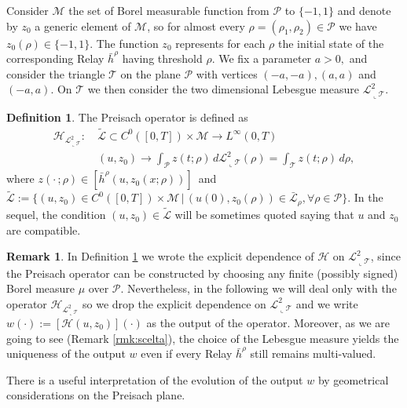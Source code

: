 \documentclass[12pt]{article}
\newcommand{\M}{\mathcal{M}}
\newcommand{\HM}{\mathcal{H}}
\newcommand{\LL}{\mathcal{L}}
\newcommand{\LM}{\mathscr{L}}
\newcommand{\T}{\mathcal{T}}
\newcommand{\PP}{\mathcal{P}}
\newcommand{\p}{\rho}
\newcommand{\1}{\mathds{1}}
\theoremstyle{definition}
\newtheorem{defi}[teo]{Definition}
\newtheorem{rmk}[teo]{Remark}
\begin{document}
Consider $\M$ the set of Borel measurable function from $\PP$ to $\{-1,1\}$ and denote by $z_0$ a generic element of $\M$, so for almost every $ \p=(\p_1,\p_2)\in \PP$ we have $z_0(\p) \in \{-1,1\}.$ The function $z_0$ represents for each $\p$ the initial state of the corresponding Relay $\bar{h}^\rho$ having threshold $\p$. We fix a parameter $a>0,$ and consider the triangle $\T$ on the plane $\PP$ with vertices $(-a,-a),(a,a)$ and $(-a,a)$. On $\T$ we then consider the two dimensional Lebesgue measure $\LM^2_{\llcorner \T}$.
\begin{defi}\label{def: POpe}
    The Preisach operator is defined as 
    \begin{equation}
    \label{eq:Preisach}
        \begin{split}
            \HM_{\LM^2_{\llcorner \T}} :~& \tilde{\LL} \subset C^0([0,T]) \times \M \to L^{\infty}(0,T) \\
            &(u,z_0)\to \int_{\PP} 
            z(t;\p)
            \,d \LM^2_{\llcorner \T} (\p)= \int_\T z(t;\p)\, d\p,
            \end{split}
        \end{equation}
        where $z(\cdot\,;\p)\in[\bar{h}^\p (u, z_0(x;\p))]\,$ and $\tilde{\LL}:=\{(u,z_0)\in C^0([0,T])\times \M \,|\, (u(0),z_0(\p)) \in \bar{\LL}_\p,\forall \p \in \PP\}.$ In the sequel, the condition $(u,z_0)\in\tilde{\LL}$ will be sometimes quoted saying that $u$ and $z_0$ are compatible.
\end{defi}

\begin{rmk}
    In Definition \ref{def: POpe} we wrote the explicit dependence of $\HM$ on $\LM^2_{\llcorner \T}$, since the Preisach operator can be constructed by choosing any finite (possibly signed) Borel measure $\mu$ over $\PP$. Nevertheless, in the following we will deal only with the operator $\HM_{\LM^2_{\llcorner \T}}$ so we drop the explicit dependence on $\LM^2_{\llcorner \T}$ and we write $w(\cdot):=[\HM(u,z_0)](\cdot)$ as the output of the operator. Moreover, as we are going to see (Remark \ref{rmk:scelta}), the choice of the Lebesgue measure yields the uniqueness of the output $w$ even if every Relay $\bar{h}^\rho$ still remains multi-valued. 
\end{rmk}

There is a useful interpretation of the evolution of the output $w$ by geometrical considerations on the Preisach plane. 
\end{document}
